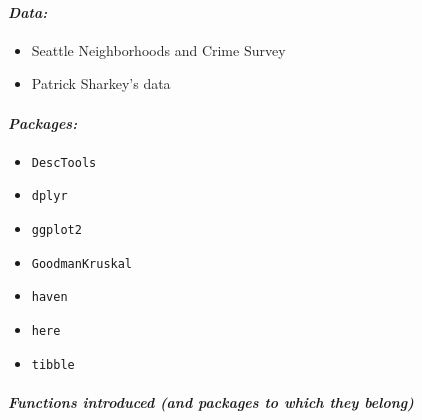 \documentclass[
]{book}
\providecommand{\tightlist}{%
  \setlength{\itemsep}{0pt}\setlength{\parskip}{0pt}}
\begin{document}
\hypertarget{data-7}{%
\paragraph*{\texorpdfstring{\emph{Data:}}{Data:}}\label{data-7}}

\begin{itemize}
\tightlist
\item
  Seattle Neighborhoods and Crime Survey
\item
  Patrick Sharkey's data
\end{itemize}

\hypertarget{packages-8}{%
\paragraph*{\texorpdfstring{\emph{Packages:}}{Packages:}}\label{packages-8}}

\begin{itemize}
\tightlist
\item
  \texttt{DescTools}
\item
  \texttt{dplyr}
\item
  \texttt{ggplot2}
\item
  \texttt{GoodmanKruskal}
\item
  \texttt{haven}
\item
  \texttt{here}
\item
  \texttt{tibble}
\end{itemize}

\hypertarget{functions-introduced-and-packages-to-which-they-belong-7}{%
\paragraph*{\texorpdfstring{\emph{Functions introduced (and packages to which they belong)}}{Functions introduced (and packages to which they belong)}}\label{functions-introduced-and-packages-to-which-they-belong-7}}
\end{document}

